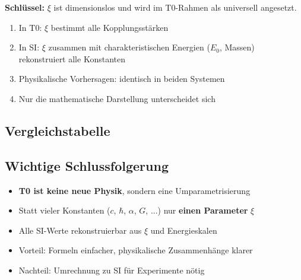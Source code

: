 	\textbf{Schlüssel:} $\xi$ ist dimensionslos und wird im T0-Rahmen als universell angesetzt.
	
	\begin{enumerate}
		\item In T0: $\xi$ bestimmt alle Kopplungsstärken
		
		\item In SI: $\xi$ zusammen mit charakteristischen Energien ($E_0$, Massen) rekonstruiert alle Konstanten
		
		\item Physikalische Vorhersagen: identisch in beiden Systemen
		
		\item Nur die mathematische Darstellung unterscheidet sich
	\end{enumerate}
	
	\subsection{Vergleichstabelle}
	
	\begin{table}[h]
		\centering
		\caption{T0 vs. SI - Rekonstruktion der Konstanten}
	\end{table}
	
	\subsection{Wichtige Schlussfolgerung}
	
	\begin{itemize}
		\item \textbf{T0 ist keine neue Physik}, sondern eine Umparametrisierung
		
		\item Statt vieler Konstanten ($c$, $\hbar$, $\alpha$, $G$, ...) nur \textbf{einen Parameter} $\xi$
		
		\item Alle SI-Werte rekonstruierbar aus $\xi$ und Energieskalen
		
		\item Vorteil: Formeln einfacher, physikalische Zusammenhänge klarer
		
		\item Nachteil: Umrechnung zu SI für Experimente nötig
	\end{itemize}
	
